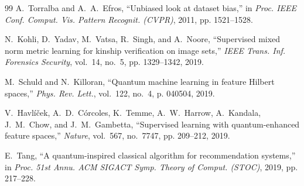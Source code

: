 \documentclass[journal,12pt]{IEEEtran}
\begin{document}
\begin{thebibliography}{99}
A.~Torralba and A.~A.~Efros, ``Unbiased look at dataset bias,'' in \emph{Proc. IEEE Conf. Comput. Vis. Pattern Recognit. (CVPR)}, 2011, pp. 1521--1528.

N.~Kohli, D.~Yadav, M.~Vatsa, R.~Singh, and A.~Noore, ``Supervised mixed norm metric learning for kinship verification on image sets,'' \emph{IEEE Trans. Inf. Forensics Security}, vol.~14, no.~5, pp. 1329--1342, 2019.

M.~Schuld and N.~Killoran, ``Quantum machine learning in feature Hilbert spaces,'' \emph{Phys. Rev. Lett.}, vol.~122, no.~4, p. 040504, 2019.

V.~Havl{\'i}{\v{c}}ek, A.~D.~C{\'o}rcoles, K.~Temme, A.~W.~Harrow, A.~Kandala, J.~M.~Chow, and J.~M.~Gambetta, ``Supervised learning with quantum-enhanced feature spaces,'' \emph{Nature}, vol.~567, no.~7747, pp. 209--212, 2019.

E.~Tang, ``A quantum-inspired classical algorithm for recommendation systems,'' in \emph{Proc. 51st Annu. ACM SIGACT Symp. Theory of Comput. (STOC)}, 2019, pp. 217--228.

\end{thebibliography}
\end{document}
